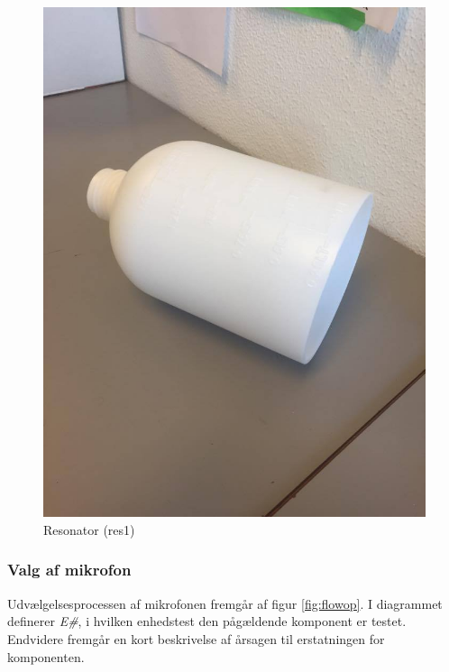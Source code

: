 \begin{figure}[htbp]
\begin{minipage}[b]{0.5\linewidth}
    \includegraphics[width=\linewidth]{resonator.jpg}
    \caption{Resonator (res1)}
    \label{fig:res}
  \end{minipage}
\end{figure}

\subsubsection{Valg af mikrofon}

Udvælgelsesprocessen af mikrofonen fremgår af figur \ref{fig:flowop}. I diagrammet definerer \textit{E\#}, i hvilken enhedstest den pågældende komponent er testet. Endvidere fremgår en kort beskrivelse af årsagen til erstatningen for komponenten. 

